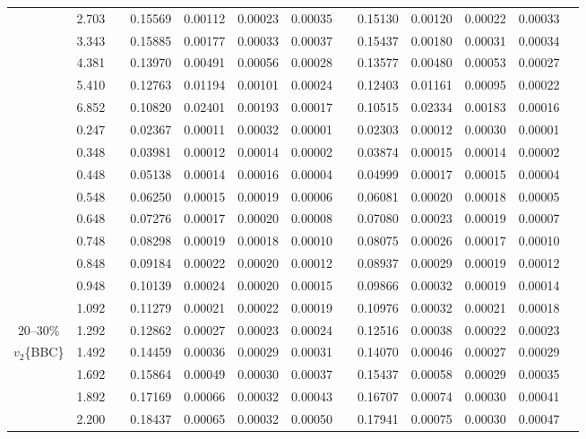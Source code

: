 \documentclass[aps,prc,superscriptaddress,showpacs,floatfix,twocolumn]{revtex4}
\begin{document}
\begin{table}[htbp]
\begin{ruledtabular}
\begin{tabular}{c|cccccccccccc}
 & 2.703 && 0.15569 & 0.00112 & 0.00023 & 0.00035 & & 0.15130 & 0.00120 & 0.00022 & 0.00033 \\ 
 & 3.343 && 0.15885 & 0.00177 & 0.00033 & 0.00037 & & 0.15437 & 0.00180 & 0.00031 & 0.00034 \\ 
 & 4.381 && 0.13970 & 0.00491 & 0.00056 & 0.00028 & & 0.13577 & 0.00480 & 0.00053 & 0.00027 \\ 
 & 5.410 && 0.12763 & 0.01194 & 0.00101 & 0.00024 & & 0.12403 & 0.01161 & 0.00095 & 0.00022 \\ 
 & 6.852 && 0.10820 & 0.02401 & 0.00193 & 0.00017 & & 0.10515 & 0.02334 & 0.00183 & 0.00016 \\ 
\hline
 & 0.247 && 0.02367 & 0.00011 & 0.00032 & 0.00001 & & 0.02303 & 0.00012 & 0.00030 & 0.00001 \\ 
 & 0.348 && 0.03981 & 0.00012 & 0.00014 & 0.00002 & & 0.03874 & 0.00015 & 0.00014 & 0.00002 \\ 
 & 0.448 && 0.05138 & 0.00014 & 0.00016 & 0.00004 & & 0.04999 & 0.00017 & 0.00015 & 0.00004 \\ 
 & 0.548 && 0.06250 & 0.00015 & 0.00019 & 0.00006 & & 0.06081 & 0.00020 & 0.00018 & 0.00005 \\ 
 & 0.648 && 0.07276 & 0.00017 & 0.00020 & 0.00008 & & 0.07080 & 0.00023 & 0.00019 & 0.00007 \\ 
 & 0.748 && 0.08298 & 0.00019 & 0.00018 & 0.00010 & & 0.08075 & 0.00026 & 0.00017 & 0.00010 \\ 
 & 0.848 && 0.09184 & 0.00022 & 0.00020 & 0.00012 & & 0.08937 & 0.00029 & 0.00019 & 0.00012 \\ 
 & 0.948 && 0.10139 & 0.00024 & 0.00020 & 0.00015 & & 0.09866 & 0.00032 & 0.00019 & 0.00014 \\ 
 & 1.092 && 0.11279 & 0.00021 & 0.00022 & 0.00019 & & 0.10976 & 0.00032 & 0.00021 & 0.00018 \\ 
20--30\%
 & 1.292 && 0.12862 & 0.00027 & 0.00023 & 0.00024 & & 0.12516 & 0.00038 & 0.00022 & 0.00023 \\ 
$v_2$\{BBC\}
 & 1.492 && 0.14459 & 0.00036 & 0.00029 & 0.00031 & & 0.14070 & 0.00046 & 0.00027 & 0.00029 \\ 
 & 1.692 && 0.15864 & 0.00049 & 0.00030 & 0.00037 & & 0.15437 & 0.00058 & 0.00029 & 0.00035 \\ 
 & 1.892 && 0.17169 & 0.00066 & 0.00032 & 0.00043 & & 0.16707 & 0.00074 & 0.00030 & 0.00041 \\ 
 & 2.200 && 0.18437 & 0.00065 & 0.00032 & 0.00050 & & 0.17941 & 0.00075 & 0.00030 & 0.00047 \\ 

\end{tabular}
\end{ruledtabular}
\end{table}
\end{document}
